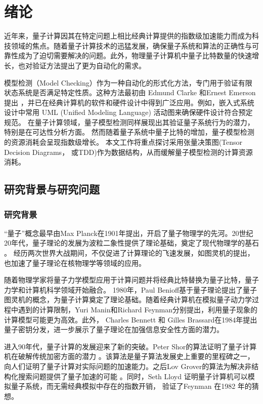 \chapter{绪论}
近年来，量子计算因其在特定问题上相比经典计算提供的指数级加速能力而成为科技领域的焦点。随着量子计算技术的迅猛发展，确保量子系统和算法的正确性与可靠性成为了迫切需要解决的问题。此外，物理量子计算机中量子比特数量的快速增长，也对验证方法提出了更为自动化的需求。

模型检测（Model Checking）作为一种自动化的形式化方法，专门用于验证有限状态系统是否满足特定性质。这种方法最初由 Edmund Clarke 和Ernest Emerson 提出
\citep{Emerson_1980,Clarke,Clarke_1986}，并已在经典计算机的软件和硬件设计中得到广泛应用。例如，嵌入式系统设计中常用 UML (Unified Modeling Language) 活动图来确保硬件设计符合预定规范\citep{Grobelna_2015}。
在量子计算领域，量子模型检测同样展现出其验证量子系统行为的潜力，特别是在可达性分析方面。
然而随着量子系统中量子比特的增加，量子模型检测的资源消耗会呈现指数级增长。
本文工作将重点探讨采用张量决策图(Tensor Decision Diagrams， 或TDD)作为数据结构，从而缓解量子模型检测的计算资源消耗。


\section{研究背景与研究问题}
\subsection{研究背景}
“量子”概念最早由Max Planck在1901年提出，开启了量子物理学的先河\citep{planck1901law}。20世纪20年代，量子理论的发展为波粒二象性提供了理论基础，奠定了现代物理学的基石
\citep{bhatta2020plurality}。
经历两次世界大战期间，不仅促进了计算理论的飞速发展，如图灵机的提出\citep{hodges2014alan}，也加速了量子理论在核物理学等领域的应用\citep{maartensson2006manhattan}。

随着物理学家将量子力学模型应用于计算问题并将经典比特替换为量子比特，量子力学和计算机科学领域开始融合。 1980年，Paul Benioff基于量子理论提出了量子图灵机的概念，为量子计算奠定了理论基础\citep{benioff1980computer}。随着经典计算机在模拟量子动力学过程中遇到的计算限制，Yuri Manin和Richard Feynman分别提出，利用量子现象的计算模型可能更为高效\citep{Feynman,manin1980vychislimoe}。此外， Charles Bennett 和 Gilles Brassard在1984年提出量子密钥分发，进一步展示了量子理论在加强信息安全性方面的潜力\citep{bennett2014quantum}。


进入90年代，量子计算的发展迎来了新的突破。Peter Shor的算法证明了量子计算机在破解传统加密方面的潜力\citep{Shor} 。该算法是量子算法发展史上重要的里程碑之一，向人们证明了量子计算对实际问题的加速能力。之后Lov Grover的算法为解决非结构化搜索问题提供了量子加速的可能\citep{Grover_1996} 。同时，Seth Lloyd 证明量子计算机可以模拟量子系统，而无需经典模拟中存在的指数开销\citep{lloyd1996universal}， 验证了Feynman 在1982 年的猜想\citep{cao2019quantum}。

